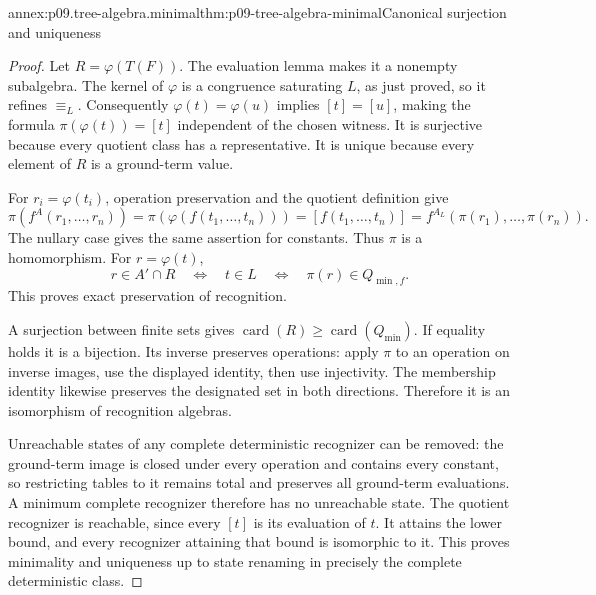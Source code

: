 \begin{annexitem}{annex:p09.tree-algebra.minimal}{thm:p09-tree-algebra-minimal}{Canonical surjection and uniqueness}
\begin{proof}
Let \(R=\varphi(T(F))\). The evaluation lemma makes it a nonempty
subalgebra. The kernel of \(\varphi\) is a congruence saturating \(L\),
as just proved, so it refines \(\equiv_L\). Consequently
\(\varphi(t)=\varphi(u)\) implies \([t]=[u]\), making the
formula \(\pi(\varphi(t))=[t]\) independent of the chosen witness.
It is surjective because every quotient class has a representative.
It is unique because every element of \(R\) is a ground-term value.

For \(r_i=\varphi(t_i)\), operation preservation and the quotient
definition give
\[
 \pi(f^A(r_1,\ldots,r_n))
   =\pi(\varphi(f(t_1,\ldots,t_n)))
   =[f(t_1,\ldots,t_n)]
   =f^{A_L}(\pi(r_1),\ldots,\pi(r_n)).
\]
The nullary case gives the same assertion for constants.
Thus \(\pi\) is a homomorphism. For \(r=\varphi(t)\),
\[
 r\in A'\cap R
 \quad\Longleftrightarrow\quad t\in L
 \quad\Longleftrightarrow\quad \pi(r)\in Q_{\min,f}.
\]
This proves exact preservation of recognition.

A surjection between finite sets gives
\(\operatorname{card}(R)\geq\operatorname{card}(Q_{\min})\).
If equality holds it is a bijection. Its inverse preserves operations:
apply \(\pi\) to an operation on inverse images, use the displayed
identity, then use injectivity. The membership identity likewise
preserves the designated set in both directions. Therefore it is
an isomorphism of recognition algebras.

Unreachable states of any complete deterministic recognizer can be
removed: the ground-term image is closed under every operation and
contains every constant, so restricting tables to it remains total
and preserves all ground-term evaluations. A minimum complete recognizer
therefore has no unreachable state. The quotient recognizer is
reachable, since every \([t]\) is its evaluation of \(t\).
It attains the lower bound, and every recognizer attaining that bound
is isomorphic to it. This proves minimality and uniqueness up to
state renaming in precisely the complete deterministic class.
\end{proof}
\end{annexitem}

